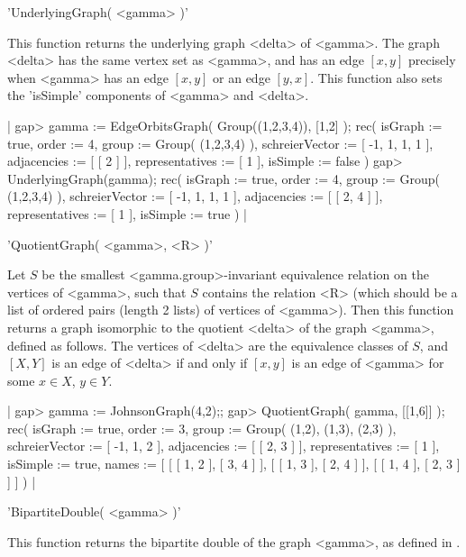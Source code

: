 
'UnderlyingGraph( <gamma> )'

This function returns the underlying graph <delta> of <gamma>.  The graph
<delta> has the  same vertex  set  as  <gamma>, and  has  an edge $[x,y]$
precisely  when <gamma> has  an  edge $[x,y]$  or an edge  $[y,x]$.  This
function also sets the 'isSimple' components of <gamma> and <delta>.

|    gap> gamma := EdgeOrbitsGraph( Group((1,2,3,4)), [1,2] );
    rec(
      isGraph := true,
      order := 4,
      group := Group( (1,2,3,4) ),
      schreierVector := [ -1, 1, 1, 1 ],
      adjacencies := [ [ 2 ] ],
      representatives := [ 1 ],
      isSimple := false )
    gap> UnderlyingGraph(gamma);
    rec(
      isGraph := true,
      order := 4,
      group := Group( (1,2,3,4) ),
      schreierVector := [ -1, 1, 1, 1 ],
      adjacencies := [ [ 2, 4 ] ],
      representatives := [ 1 ],
      isSimple := true ) |


'QuotientGraph( <gamma>, <R> )'

Let $S$ be  the smallest <gamma.group>-invariant  equivalence relation on
the vertices of <gamma>, such  that $S$ contains  the relation <R> (which
should  be a  list  of ordered  pairs (length  2  lists) of  vertices  of
<gamma>).  Then this function returns  a graph isomorphic to the quotient
<delta> of  the  graph <gamma>, defined  as   follows.   The vertices  of
<delta> are  the equivalence classes of $S$,  and $[X,Y]$ is an  edge  of
<delta> if and only if $[x,y]$ is  an edge of <gamma>  for some $x\in X$,
$y\in Y$.

|    gap> gamma := JohnsonGraph(4,2);;
    gap> QuotientGraph( gamma, [[1,6]] );
    rec(
      isGraph := true,
      order := 3,
      group := Group( (1,2), (1,3), (2,3) ),
      schreierVector := [ -1, 1, 2 ],
      adjacencies := [ [ 2, 3 ] ],
      representatives := [ 1 ],
      isSimple := true,
      names := [ [ [ 1, 2 ], [ 3, 4 ] ], [ [ 1, 3 ], [ 2, 4 ] ],
          [ [ 1, 4 ], [ 2, 3 ] ] ] ) |


'BipartiteDouble( <gamma> )'

This function  returns the  bipartite  double  of the graph  <gamma>,  as
defined in \cite{BCN89}.


